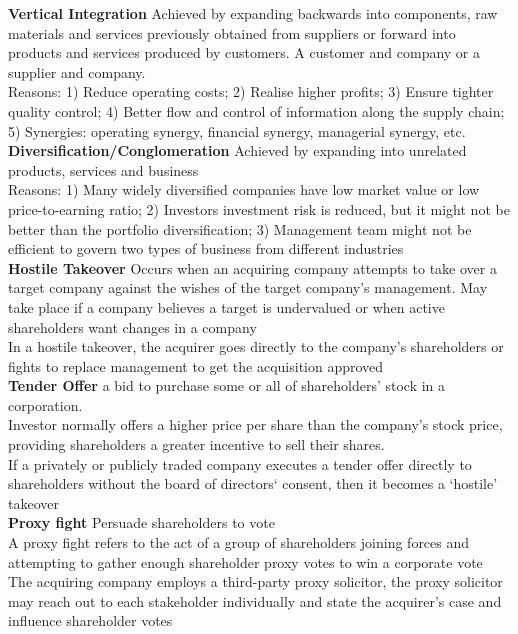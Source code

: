 \documentclass[12pt,landscape, a4paper]{article}
\theoremstyle{remark}
\begin{document}
\begin{multicols*}{3}
\textbf{Vertical Integration} Achieved by expanding backwards into components, raw materials and services previously obtained from suppliers or forward into products and services produced by customers. A customer and company or a supplier and company.\\
Reasons: 1) Reduce operating costs; 2) Realise higher profits; 3) Ensure tighter quality control; 4) Better flow and control of information along the supply chain; 5) Synergies: operating synergy, financial synergy, managerial synergy, etc.\\

\textbf{Diversification/Conglomeration} Achieved by expanding into unrelated products, services and 
business\\
Reasons: 1) Many widely diversified companies have low market value or low price-to-earning ratio; 2) Investors investment risk is reduced, but it might not be better than the portfolio diversification; 3) Management team might not be efficient to govern two types of business from different industries\\

\textbf{Hostile Takeover} Occurs when an acquiring company attempts to take over a target company against the wishes of the target company's management. May take place if a company believes a target is undervalued or when active shareholders want changes in a company\\
In a hostile takeover, the acquirer goes directly to the company's shareholders or fights to replace management to get the acquisition approved\\
\textbf{Tender Offer} a bid to purchase some or all of shareholders' stock in a corporation.\\
Investor normally offers a higher price per share than the company’s stock price, providing shareholders a greater incentive to sell their shares. \\
If a privately or publicly traded company executes a tender offer directly to shareholders without the board of directors‘ consent, then it becomes a `hostile' takeover\\

\textbf{Proxy fight} Persuade shareholders to vote\\
A proxy fight refers to the act of a group of shareholders joining forces and attempting to gather enough shareholder proxy votes to win a corporate vote\\
The acquiring company employs a third-party proxy solicitor, the proxy solicitor may reach out to each stakeholder individually and state the acquirer's case and influence shareholder votes\\


\end{multicols*}
\end{document}
